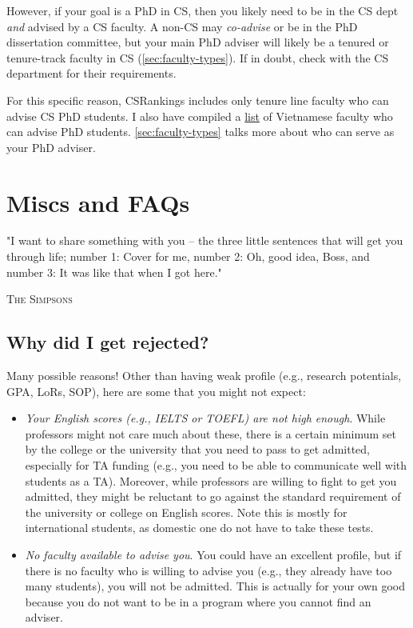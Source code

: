 \documentclass[oneside,11pt]{memoir}
\begin{document}
However, if your goal is a PhD in CS, then you likely need to be in the CS dept \emph{and} advised by a CS faculty. A non-CS may \emph{co-advise} or be in the PhD dissertation committee, but your main PhD adviser will likely be a tenured or tenure-track faculty in CS (\autoref{sec:faculty-types}). If in doubt, check with the CS department for their requirements.

For this specific reason,  CSRankings includes only tenure line faculty who can advise CS PhD students. I also have compiled a \href{https://github.com/dynaroars/dynaroars.github.io/wiki/Viet-CS-Profs-US}{list} of Vietnamese faculty who can advise PhD students. \autoref{sec:faculty-types} talks more about who can serve as your PhD adviser.


\chapter{Miscs and FAQs}
\epigraph{"I want to share something with you – the three little sentences that will get you through life; number 1: Cover for me, number 2: Oh, good idea, Boss, and number 3: It was like that when I got here."}{\textsc{The Simpsons}}

\section{Why did I get rejected?}
Many possible reasons!  Other than having weak profile (e.g., research potentials, GPA, LoRs, SOP), here are some that you might not expect:
\begin{itemize}
  \item  \emph{Your English scores (e.g., IELTS or TOEFL) are not high enough}.  While professors might not care much about these, there is a certain minimum set by the college or the university that you need to pass to get admitted, especially for TA funding (e.g., you need to be able to communicate well with students as a TA).  Moreover, while professors are willing to fight to get you admitted, they might be reluctant to go against the standard requirement of the university or college on English scores.  Note this is mostly for international students, as domestic one do not have to take these tests.

  \item \emph{No faculty available to advise you}.  You could have an excellent profile, but if there is no faculty who is willing to advise you (e.g., they already have too many students), you will not be admitted. This is actually for your own good because you do not want to be in a program where you cannot find an adviser.
\end{itemize}
\end{document}

